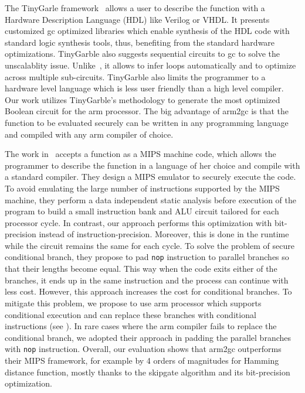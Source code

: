 The TinyGarle framework~\cite{songhori2015tinygarble} allows a user to describe the function with a Hardware Description Language (HDL) like Verilog or VHDL.
It presents customized \acrshort{gc} optimized libraries which enable synthesis of the HDL code with standard logic synthesis tools, thus, benefiting from the standard hardware optimizations.
TinyGarble also suggests sequential circuits to \acrshort{gc} to solve the unscalablity issue.
Unlike~\cite{kreuter2013pcf}, it allows to infer loops automatically and to optimize across multiple sub-circuits.
TinyGarble also limits the programmer to a hardware level language which is less user friendly than a high level compiler.
Our work utilizes TinyGarble's methodology to generate the most optimized Boolean circuit for the \gls{arm} processor.
The big advantage of \gls{arm2gc} is that the function to be evaluated securely can be written in any programming language and compiled with any \gls{arm} compiler of choice.

The work in~\cite{wang2015secure} accepts a function as a MIPS machine code, which allows the programmer to describe the function in a language of her choice and compile with a standard compiler.
They design a MIPS emulator to securely execute the code.
To avoid emulating the large number of instructions supported by the MIPS machine, they perform a data independent static analysis before execution of the program to build a small instruction bank and ALU circuit tailored for each processor cycle.
In contrast, our approach performs this optimization with bit-precision instead of instruction-precision.
Moreover, this is done in the runtime while the circuit remains the same for each cycle.
To solve the problem of secure conditional branch, they propose to pad \texttt{nop} instruction to parallel branches so that their lengths become equal.
This way when the code exits either of the branches, it ends up in the same instruction and the process can continue with less cost.
However, this approach increases the cost for conditional branches.
To mitigate this problem, we propose to use \gls{arm} processor which supports conditional execution and can replace these branches with conditional instructions (see ).
In rare cases where the \gls{arm} compiler fails to replace the conditional branch, we adopted their approach in padding the parallel branches with \texttt{nop} instruction.
Overall, our evaluation shows that \gls{arm2gc} outperforms their MIPS framework, for example by 4 orders of magnitudes for Hamming distance function, mostly thanks to the \gls{skipgate} algorithm and its bit-precision optimization.

